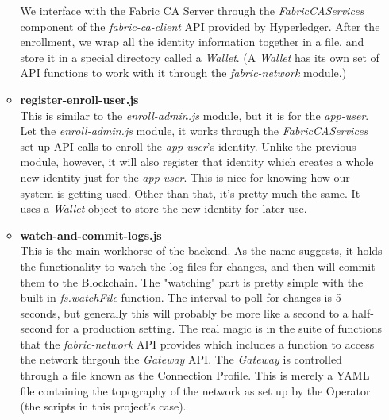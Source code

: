 \begin{itemize}
\begin{itemize}
							\hspace{10mm}We interface with the Fabric CA Server through the \textit{FabricCAServices} component of the \textit{fabric-ca-client} API provided by Hyperledger. After the enrollment, we wrap all the identity information together in a file, and store it in a special directory called a \textit{Wallet}. (A \textit{Wallet} has its own set of API functions to work with it through the \textit{fabric-network} module.)
							
						\item \textbf{register-enroll-user.js}\\
							
							\hspace{10mm}This is similar to the \textit{enroll-admin.js} module, but it is for the \textit{app-user}. Let the \textit{enroll-admin.js} module, it works through the \textit{FabricCAServices} set up API calls to enroll the \textit{app-user}'s identity. Unlike the previous module, however, it will also register that identity which creates a whole new identity just for the \textit{app-user}. This is nice for knowing how our system is getting used. Other than that, it's pretty much the same. It uses a \textit{Wallet} object to store the new identity for later use.
							
						\item \textbf{watch-and-commit-logs.js}\\
						
							\hspace{10mm}This is the main workhorse of the backend. As the name suggests, it holds the functionality to watch the log files for changes, and then will commit them to the Blockchain. The "watching" part is pretty simple with the built-in \textit{fs.watchFile} function. The interval to poll for changes is 5 seconds, but generally this will probably be more like a second to a half-second for a production setting. The real magic is in the suite of functions that the \textit{fabric-network} API provides which includes a function to access the network thrgouh the \textit{Gateway} API. The \textit{Gateway} is controlled through a file known as the Connection Profile. This is merely a YAML file containing the topography of the network as set up by the Operator (the scripts in this project's case).\\
							

\end{itemize}
\end{itemize}
